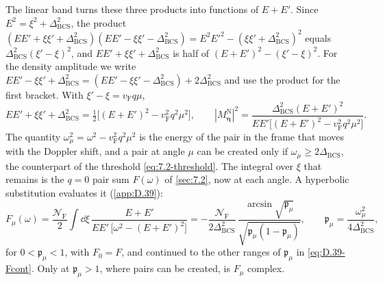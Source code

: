 The linear band turns these three products into functions of $E + E'$. Since $E^2 = \xi^2 + \Delta_{\mathrm{BCS}}^2$, the product $(EE' + \xi\xi' + \Delta_{\mathrm{BCS}}^2)(EE' - \xi\xi' - \Delta_{\mathrm{BCS}}^2) = E^2E'^2 - (\xi\xi' + \Delta_{\mathrm{BCS}}^2)^2$ equals $\Delta_{\mathrm{BCS}}^2(\xi' - \xi)^2$, and $EE' + \xi\xi' + \Delta_{\mathrm{BCS}}^2$ is half of $(E + E')^2 - (\xi' - \xi)^2$. For the density amplitude we write $EE' - \xi\xi' + \Delta_{\mathrm{BCS}}^2 = (EE' - \xi\xi' - \Delta_{\mathrm{BCS}}^2) + 2\Delta_{\mathrm{BCS}}^2$ and use the product for the first bracket. With $\xi' - \xi = v_{\mathrm{F}}q\mu$,
\begin{equation}
  EE' + \xi\xi' + \Delta_{\mathrm{BCS}}^2 = \tfrac12\bigl[(E + E')^2 - v_{\mathrm{F}}^2q^2\mu^2\bigr], \qquad
  |M^{\mathrm{N}}_{\boldsymbol{\eta}}|^2 = \frac{\Delta_{\mathrm{BCS}}^2(E + E')^2}{EE'\bigl[(E + E')^2 - v_{\mathrm{F}}^2q^2\mu^2\bigr]} .
  \label{eq:15.1-ident}
\end{equation}
The quantity $\omega_\mu^2 = \omega^2 - v_{\mathrm{F}}^2q^2\mu^2$ is the energy of the pair in the frame that moves with the Doppler shift, and a pair at angle $\mu$ can be created only if $\omega_\mu \ge 2\Delta_{\mathrm{BCS}}$, the counterpart of the threshold \cref{eq:7.2-threshold}. The integral over $\xi$ that remains is the $q = 0$ pair sum $F(\omega)$ of \cref{sec:7.2}, now at each angle. A hyperbolic substitution evaluates it (\cref{app:D.39}):
\begin{equation}
  F_\mu(\omega) = \frac{\mathcal{N}_{\mathrm{F}}}{2}\int\dd\xi\,\frac{E + E'}{EE'\,\bigl[\omega^2 - (E + E')^2\bigr]}
  = -\frac{\mathcal{N}_{\mathrm{F}}}{2\Delta_{\mathrm{BCS}}^2}\,\frac{\arcsin\sqrt{\mathfrak{p}_\mu}}{\sqrt{\mathfrak{p}_\mu(1 - \mathfrak{p}_\mu)}}, \qquad
  \mathfrak{p}_\mu = \frac{\omega_\mu^2}{4\Delta_{\mathrm{BCS}}^2} ,
  \label{eq:15.1-F}
\end{equation}
for $0 < \mathfrak{p}_\mu < 1$, with $F_0 = F$, and continued to the other ranges of $\mathfrak{p}_\mu$ in \cref{eq:D.39-Fcont}. Only at $\mathfrak{p}_\mu > 1$, where pairs can be created, is $F_\mu$ complex.

